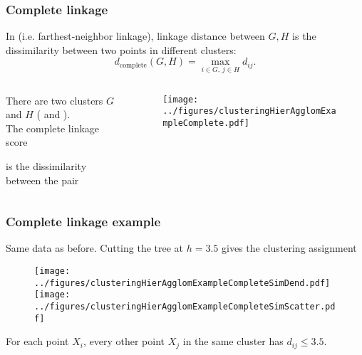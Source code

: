 \documentclass{beamer}
\begin{document}
\begin{frame}
\frametitle{Complete linkage}
In  (i.e. farthest-neighbor linkage), linkage distance between $G,H$ is the  
dissimilarity between two points in different clusters:
\[
d_{\textrm{complete}}(G,H) = \max_{i \in G,\, j \in H} d_{ij}.
\]
\begin{columns}[T]
\begin{column}{.52\textwidth}
\vsp


 There are two clusters $G$ and $H$ ( and ).  \\ The complete linkage
score 


is the dissimilarity between the  pair 

\end{column}
\begin{column}{.48\textwidth}
\begin{figure}[h!]
  \centering
  \texttt{[image: ../figures/clusteringHierAgglomExampleComplete.pdf]}
\end{figure}
\end{column}
\end{columns}
\end{frame}

\begin{frame}
\frametitle{Complete linkage example}
Same data as before.  Cutting the tree at $h= 3.5$ gives the clustering assignment
\begin{figure}[h!]
  \centering
  \texttt{[image: ../figures/clusteringHierAgglomExampleCompleteSimDend.pdf]}
  \texttt{[image: ../figures/clusteringHierAgglomExampleCompleteSimScatter.pdf]}  
\end{figure}
 For each point $X_i$, every other point $X_j$ in the same cluster has $d_{ij} \leq 3.5$.

\end{frame}
\end{document}
